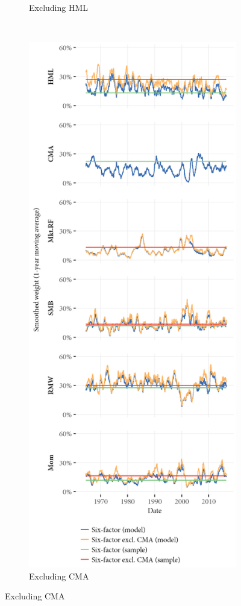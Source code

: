 \begin{figure}[htbp]
\begin{subfigure}{0.45\textwidth}
    \caption{Excluding HML}
  \end{subfigure}
  ~
  \begin{subfigure}{0.45\textwidth}
    \includegraphics[width=\textwidth]{graphics/weights/main_Weights_MV_6F_EXCL_CMA_6F.png}
    \caption{Excluding CMA}
  \end{subfigure}
\end{figure}





